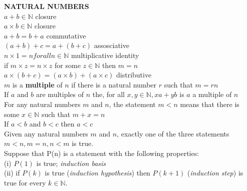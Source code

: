\documentclass[10pt,landscape]{article}
\begin{document}
\raggedright
\footnotesize
\begin{multicols}{4}


\setlength{\premulticols}{1pt}
\setlength{\postmulticols}{1pt}
\setlength{\multicolsep}{1pt}
\setlength{\columnsep}{2pt}

\textbf{NATURAL NUMBERS}\\

$a+b \in \mathbb{N}$ closure\\


$a \times b \in \mathbb{N}$ closure\\

$a + b = b + a$ commutative\\

$(a + b) + c = a + (b + c)$ assosciative\\

$n \times 1 = n for all n \in \mathbb{N}$ multiplicative identity\\ 

if $m \times z = n \times z$ for some $z \in \mathbb{N}$ then $m =
n$\\ 

$a \times (b + c) = (a \times b) + (a \times c)$ distributive\\

$m$ is a \textbf{multiple} of $n$ if there is a natural number $r$
such that $m = rn$\\ 

If $a$ and $b$ are multiples of $n$ the, for all $x, y \in \mathbb{N},
xa + yb$ is $a$ a multiple of $n$\\ 

For any natural numbers $m$ and $n$, the statement $m < n$ means that
there is some $x \in \mathbb{N}$ such that $m + x = n$\\ 

If $a < b$ and $b < c$ then $a < c$\\

Given any natural numbers $m$ and $n$, exactly one of the three
statements $m<n, m=n, n<m$ is true.\\

Suppose that P(n) is a statement with the following properties:\\

(i) $P(1)$ is true; \textit{induction basis}\\

(ii) if $P(k)$ is true (\textit{induction hypothesis}) then $P(k+1)$
(\textit{induction step}) is true for every $k \in \mathbb{N}$.\\  


\end{multicols}
\end{document}
